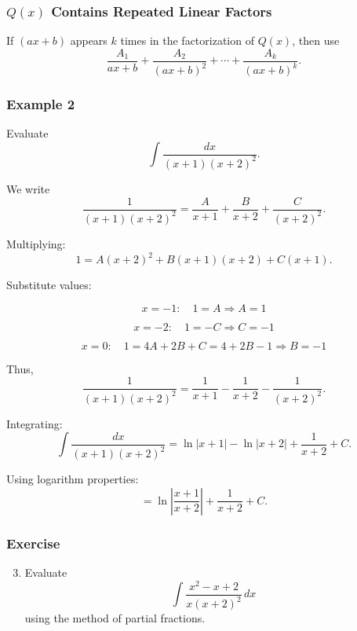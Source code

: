 \subsubsection{$Q(x)$ Contains Repeated Linear Factors}
\label{sss:qxis-3eeb}

If $(ax+b)$ appears $k$ times in the factorization of $Q(x)$, then use
\[
\frac{A_1}{ax+b} + \frac{A_2}{(ax+b)^2} + \cdots + \frac{A_k}{(ax+b)^k}.
\]

\subsubsection{Example 2}
\label{sss:exam-5bdd}

Evaluate
\[
\int \frac{dx}{(x+1)(x+2)^2}.
\]

We write
\[
\frac{1}{(x+1)(x+2)^2}
= \frac{A}{x+1} + \frac{B}{x+2} + \frac{C}{(x+2)^2}.
\]

Multiplying:
\[
1 = A(x+2)^2 + B(x+1)(x+2) + C(x+1).
\]

Substitute values:

\[
x=-1:\quad 1 = A \Rightarrow A=1
\]

\[
x=-2:\quad 1 = -C \Rightarrow C=-1
\]

\[
x=0:\quad 1 = 4A + 2B + C = 4 + 2B -1 \Rightarrow B=-1
\]

Thus,
\[
\frac{1}{(x+1)(x+2)^2}
= \frac{1}{x+1} - \frac{1}{x+2} - \frac{1}{(x+2)^2}.
\]

Integrating:
\[
\int \frac{dx}{(x+1)(x+2)^2}
= \ln|x+1| - \ln|x+2| + \frac{1}{x+2} + C.
\]

Using logarithm properties:
\[
= \ln\left|\frac{x+1}{x+2}\right| + \frac{1}{x+2} + C.
\]


\subsubsection{Exercise}
\label{sss:exer-pf1}

\begin{enumerate}
\setcounter{enumi}{2}
\item Evaluate
\[
\int \frac{x^2 - x + 2}{x(x+2)^2}\,dx
\]
using the method of partial fractions.
\end{enumerate}

